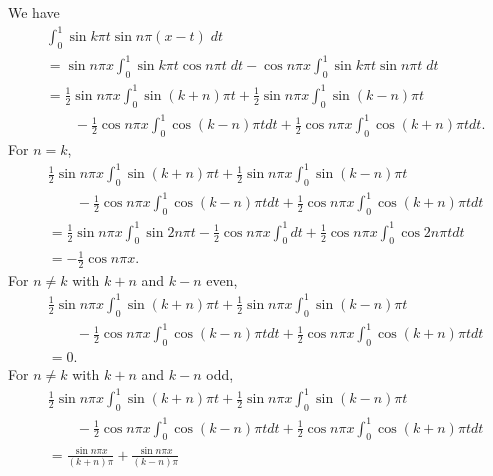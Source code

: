 \documentclass[oneside]{article}
\begin{document}
  We have
  \begin{align*}
    &\int_0^1 \sin k \pi t \sin n \pi (x-t)\;dt \\
    &= \sin n\pi x \int_0^1 \sin k \pi t \cos n \pi t\;dt - \cos n \pi x\int_0^1 \sin k \pi t \sin n \pi t\;dt \\
    &= \frac12\sin n\pi x \int_0^1 \sin (k+n) \pi t
    + \frac12\sin n\pi x \int_0^1 \sin (k-n) \pi t \\
    &\qquad- \frac12\cos n \pi x\int_0^1 \cos(k-n) \pi t dt
    + \frac12\cos n \pi x\int_0^1 \cos(k+n) \pi t dt \text{.}
  \end{align*}
  For $n = k$,\begin{align*}
    &\frac12\sin n\pi x \int_0^1 \sin (k+n) \pi t
    + \frac12\sin n\pi x \int_0^1 \sin (k-n) \pi t \\
    &\qquad- \frac12\cos n \pi x\int_0^1 \cos(k-n) \pi t dt
    + \frac12\cos n \pi x\int_0^1 \cos(k+n) \pi t dt \\
    &= \frac12\sin n\pi x \int_0^1 \sin 2 n \pi t
    - \frac12\cos n \pi x\int_0^1 dt
    + \frac12\cos n \pi x\int_0^1 \cos 2 n \pi t dt \\
    &= - \frac12\cos n \pi x \text{.}
  \end{align*}
  For $n \neq k$ with $k+n$ and $k-n$ even,\begin{align*}
    &\frac12\sin n\pi x \int_0^1 \sin (k+n) \pi t
    + \frac12\sin n\pi x \int_0^1 \sin (k-n) \pi t \\
    &\qquad- \frac12\cos n \pi x\int_0^1 \cos(k-n) \pi t dt
    + \frac12\cos n \pi x\int_0^1 \cos(k+n) \pi t dt \\
    &= 0 \text{.}
  \end{align*}
  For $n \neq k$ with $k+n$ and $k-n$ odd,\begin{align*}
    &\frac12\sin n\pi x \int_0^1 \sin (k+n) \pi t
    + \frac12\sin n\pi x \int_0^1 \sin (k-n) \pi t \\
    &\qquad- \frac12\cos n \pi x\int_0^1 \cos(k-n) \pi t dt
    + \frac12\cos n \pi x\int_0^1 \cos(k+n) \pi t dt \\
    &= \frac{\sin n\pi x}{(k+n)\pi}
    + \frac{\sin n\pi x}{(k-n)\pi}
  \end{align*}

\end{document}
